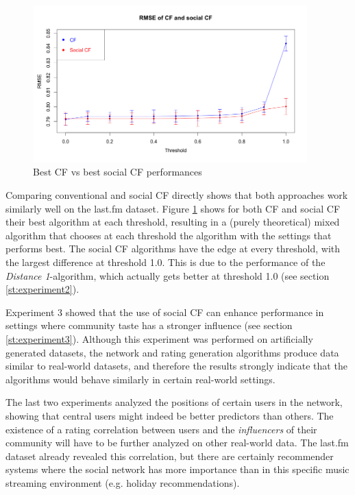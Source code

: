 \begin{figure}[!h]
\includegraphics[width=400px]{./4-experiments/figures/CFvsSocialCF_01.png}
\caption{Best CF vs best social CF performances}
\label{f:cfvssocialcf}
\end{figure}

Comparing conventional and social CF directly shows that both approaches work similarly well on the last.fm dataset. Figure \ref{f:cfvssocialcf} shows for both CF and social CF their best algorithm at each threshold, resulting in a (purely theoretical) mixed algorithm that chooses at each threshold the algorithm with the settings that performs best. The social CF algorithms have the edge at every threshold, with the largest difference at threshold 1.0. This is due to the performance of the \textit{Distance 1}-algorithm, which actually gets better at threshold 1.0 (see section \ref{st:experiment2}).
\newline

Experiment 3 showed that the use of social CF can enhance performance in settings where community taste has a stronger influence (see section \ref{st:experiment3}). Although this experiment was performed on artificially generated datasets, the network and rating generation algorithms produce data similar to real-world datasets, and therefore the results strongly indicate that the algorithms would behave similarly in certain real-world settings.
\newline

The last two experiments analyzed the positions of certain users in the network, showing that central users might indeed be better predictors than others. The existence of a rating correlation between users and the \textit{influencers} of their community will have to be further analyzed on other real-world data. The last.fm dataset already revealed this correlation, but there are certainly recommender systems where the social network has more importance than in this specific music streaming environment (e.g. holiday recommendations).